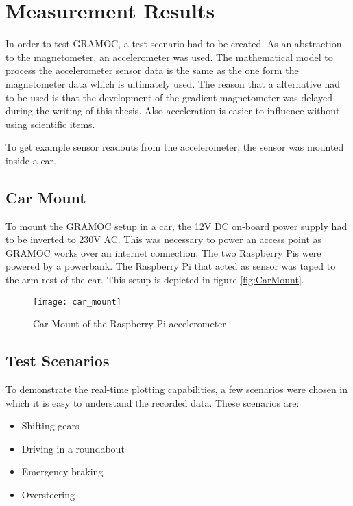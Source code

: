\chapter{Measurement Results}
\label{ch:MeasureRes}

\author{Nico Leidenfrost}
%
In order to test GRAMOC, a test scenario had to be created. As an abstraction to the magnetometer, an accelerometer was used. The mathematical model to process the accelerometer sensor data is the same as the one form the magnetometer data which is ultimately used. The reason that a alternative had to be used is that the development of the gradient magnetometer was delayed during the writing of this thesis. Also acceleration is easier to influence without using scientific items.

To get example sensor readouts from the accelerometer, the sensor was mounted inside a car.

\section{Car Mount}

To mount the GRAMOC setup in a car, the 12V DC on-board power supply had to be inverted to 230V AC. This was necessary to power an access point as GRAMOC works over an internet connection. The two Raspberry Pis were powered by a powerbank. The Raspberry Pi that acted as sensor was taped to the arm rest of the car. This setup is depicted in figure \vref{fig:CarMount}.

\begin{figure}[h]
    \centering
    \texttt{[image: car\_mount]}
    \caption{Car Mount of the Raspberry Pi accelerometer}
    \label{fig:CarMount}
\end{figure}

\section{Test Scenarios}
To demonstrate the real-time plotting capabilities, a few scenarios were chosen in which it is easy to understand the recorded data. These scenarios are:

\begin{itemize}
    \item Shifting gears
    \item Driving in a roundabout
    \item Emergency braking
    \item Oversteering
\end{itemize}

